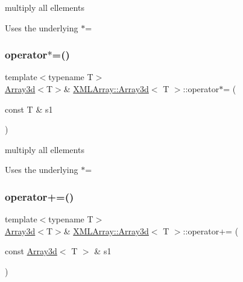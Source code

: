 multiply all ellements 

Uses the underlying $\ast$= \mbox{\label{classXMLArray_1_1Array3d_aff3679dabbd2691243dce85defb9519d}} 
\subsubsection{\texorpdfstring{operator$\ast$=()}{operator*=()}\hspace{0.1cm}{\footnotesize\ttfamily [6/6]}}
{\footnotesize\ttfamily template$<$typename T$>$ \\
\mbox{\hyperlink{classXMLArray_1_1Array3d}{Array3d}}$<$T$>$\& \mbox{\hyperlink{classXMLArray_1_1Array3d}{X\+M\+L\+Array\+::\+Array3d}}$<$ T $>$\+::operator$\ast$= (\begin{DoxyParamCaption}\item[{const T \&}]{s1 }\end{DoxyParamCaption})\hspace{0.3cm}{\ttfamily [inline]}}



multiply all ellements 

Uses the underlying $\ast$= \mbox{\label{classXMLArray_1_1Array3d_add116e7a7b9da853f2b463d5fb3a9b1e}} 
\subsubsection{\texorpdfstring{operator+=()}{operator+=()}\hspace{0.1cm}{\footnotesize\ttfamily [1/3]}}
{\footnotesize\ttfamily template$<$typename T$>$ \\
\mbox{\hyperlink{classXMLArray_1_1Array3d}{Array3d}}$<$T$>$\& \mbox{\hyperlink{classXMLArray_1_1Array3d}{X\+M\+L\+Array\+::\+Array3d}}$<$ T $>$\+::operator+= (\begin{DoxyParamCaption}\item[{const \mbox{\hyperlink{classXMLArray_1_1Array3d}{Array3d}}$<$ T $>$ \&}]{s1 }\end{DoxyParamCaption})\hspace{0.3cm}{\ttfamily [inline]}}



